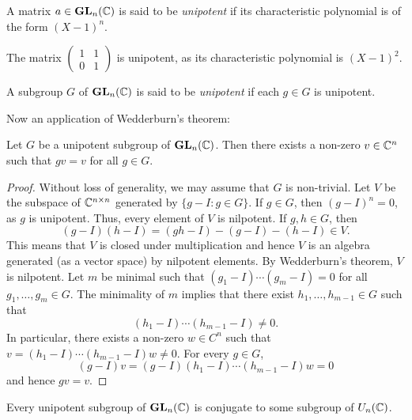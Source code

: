 \begin{definition}
    A matrix $a\in\mathbf{GL}_n(\mathbb{C})$ is said to be \emph{unipotent} 
    if its characteristic polynomial is of the form 
    $(X-1)^n$. 
\end{definition}

The matrix $\begin{pmatrix}1&1\\0&1\end{pmatrix}$ is unipotent, 
as its characteristic polynomial is $(X-1)^2$. 

\begin{definition}
    A subgroup $G$ of $\mathbf{GL}_n(\mathbb{C})$ is said to be \emph{unipotent} if
    each $g\in G$ is unipotent. 
\end{definition}

Now an application of Wedderburn's theorem:

\begin{proposition}
\label{pro:unipotent}
    Let $G$ be a unipotent subgroup of $\mathbf{GL}_n(\mathbb{C})$. 
    Then there exists a non-zero 
    $v\in\mathbb{C}^{n}$ such that $gv=v$ for all $g\in G$. 
\end{proposition}

\begin{proof}
    Without loss of generality, we may assume that $G$ is non-trivial. 
    Let $V$ be the subspace of $\mathbb{C}^{n\times n}$ 
    generated by $\{g-I:g\in G\}$. If $g\in G$, then 
    $(g-I)^n=0$, as $g$ is unipotent. Thus,
    every element of $V$ is nilpotent. If $g,h\in G$, 
    then 
    \[
    (g-I)(h-I)=(gh-I)-(g-I)-(h-I)\in V.
    \]
    This means that $V$ is closed under multiplication and
    hence $V$ is an algebra generated (as a vector space)
    by nilpotent elements. By Wedderburn's theorem, 
    $V$ is nilpotent. Let $m$ be minimal 
    such that 
    $(g_1-I)\cdots (g_m-I)=0$ 
    for all $g_1,\dots,g_m\in G$. The minimality of $m$ implies that  
    there exist $h_1,\dots,h_{m-1}\in G$ such that 
    \[
    (h_1-I)\cdots (h_{m-1}-I)\ne 0.
    \]
    In particular, there exists a non-zero 
    $w\in C^{n}$ such that 
    $v=(h_1-I)\cdots (h_{m-1}-I)w\ne 0$. For every 
    $g\in G$, 
    \[
    (g-I)v=(g-I)(h_1-I)\cdots (h_{m-1}-I)w=0
    \]
    and hence $gv=v$. 
\end{proof}

\begin{theorem}[Kolchin]
\label{thm:Kolchin}
Every unipotent subgroup of $\mathbf{GL}_n(\mathbb{C})$ is conjugate
to some subgroup of $U_n(\mathbb{C})$. 
\end{theorem}

